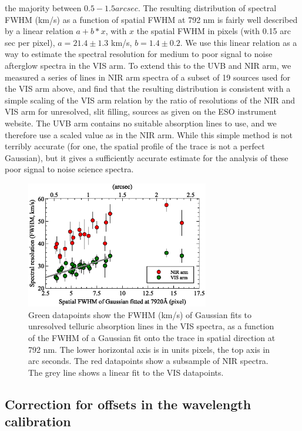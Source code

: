 \documentclass[iop, twocolappendix, numberedappendix, tighten, appendixfloats]{emulateapj}
\begin{document}
	the majority between $0.5-1.5 arcsec$.
	The resulting distribution of spectral FWHM (km/s) as a function of spatial
	FWHM at 792 nm is fairly well described by a linear relation $a + b*x$, with
	$x$ the spatial FWHM in pixels (with 0.15 arc sec per pixel),  $a= 21.4 \pm
	1.3$ km/s, $b=1.4 \pm 0.2$.
	We use this linear relation as a way to estimate the spectral resolution for
	medium to poor signal to noise afterglow spectra in the VIS arm.
	To extend this to the UVB and NIR arm, we measured a series of lines in NIR arm
	spectra of a subset of 19 sources used for the VIS arm above, and find that the
	resulting distribution is consistent with a simple scaling of the VIS arm
	relation by the ratio of resolutions of the NIR and VIS arm for unresolved,
	slit filling, sources as given on the ESO instrument website.
	The UVB arm contains no suitable absorption lines to use, and we therefore use
	a scaled value as in the NIR arm.
	While this simple method is not terribly accurate (for one, the spatial profile
	of the trace is not a perfect Gaussian), but it gives a sufficiently accurate
	estimate for the analysis of these poor signal to noise science spectra.
	
	
	\begin{figure}
		\centerline{\includegraphics[width=8cm]{figures/resolution_paper.eps}}
		\caption{Green datapoints show the FWHM (km/s) of Gaussian fits to unresolved telluric absorption lines in the VIS spectra, as a function of the FWHM of a Gaussian fit onto the trace in spatial direction at  792 nm. The lower horizontal axis is in units pixels, the top axis in arc seconds. The red datapoints show a subsample of NIR spectra.
			The grey line shows a linear fit to the VIS datapoints. }
		\label{fig:res}
	\end{figure}
	
	\subsection{Correction for offsets in the wavelength calibration}    
	
\end{document}
